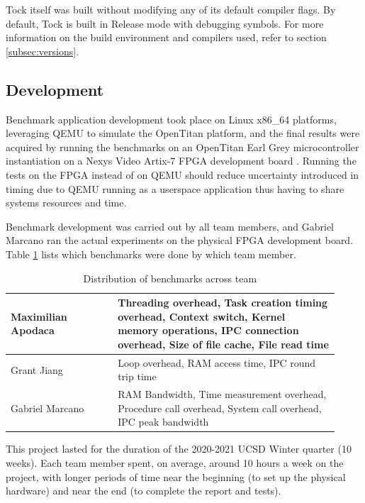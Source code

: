 \documentclass{article}
\begin{document}
Tock itself was built without modifying any of its default compiler flags. By default, Tock is built in Release mode with debugging symbols. For more information on the build environment and compilers used, refer to section \ref{subsec:versions}.

\subsection{Development}

Benchmark application development took place on Linux x86\_64 platforms, leveraging QEMU to simulate the OpenTitan platform, and the final results were acquired by running the benchmarks on an OpenTitan Earl Grey microcontroller instantiation on a Nexys Video Artix-7 FPGA development board \cite{opentitangithub}. Running the tests on the FPGA instead of on QEMU should reduce uncertainty introduced in timing due to QEMU running as a userspace application thus having to share systems resources and time.

Benchmark development was carried out by all team members, and Gabriel Marcano ran the actual experiments on the physical FPGA development board. Table \ref{table:experimenters} lists which benchmarks were done by which team member.

\begin{table}[H]
\centering
    \begin{tabular}{|p{0.30\linewidth}|| p{0.62\linewidth} |}
        \hline
        Maximilian Apodaca & Threading overhead, Task creation timing overhead, Context switch, Kernel memory operations, IPC connection overhead, Size of file cache, File read time\\
        \hline
        Grant Jiang & Loop overhead, RAM access time, IPC round trip time\\
        \hline
        Gabriel Marcano & RAM Bandwidth, Time measurement overhead, Procedure call overhead, System call overhead, IPC peak bandwidth \\
        \hline
    \end{tabular}
\caption{Distribution of benchmarks across team}
\label{table:experimenters}
\end{table}

This project lasted for the duration of the 2020-2021 UCSD Winter quarter (10 weeks). Each team member spent, on average, around 10 hours a week on the project, with longer periods of time near the beginning (to set up the physical hardware) and near the end (to complete the report and tests).
\end{document}
